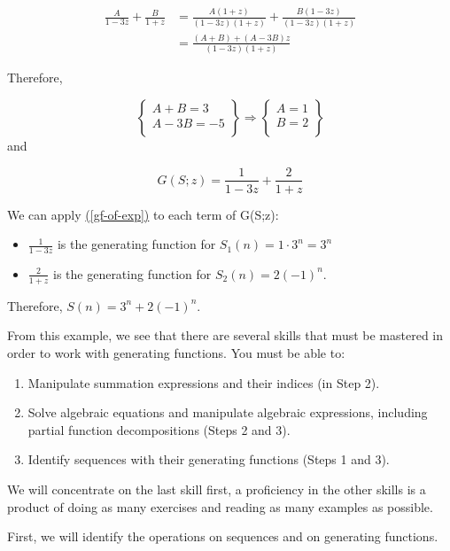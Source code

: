 \documentclass[10pt,]{book}
\theoremstyle{plain}
\theoremstyle{definition}
\theoremstyle{definition}
\theoremstyle{definition}
\theoremstyle{definition}
\numberwithin{equation}{section}
\begin{document}
\begin{enumerate}[label=\arabic*]
\begin{equation*}
\begin{split}
\frac{A}{1-3z}+ \frac{B}{1+z} &=\frac{A(1+z)}{(1-3z)(1+z)}+ \frac{B(1-3z)}{(1-3z)(1+z)}\\
		& =\frac{(A+B)+(A-3B)z}{(1-3z)(1+z)}
\end{split}
\end{equation*}
%
\par
Therefore,



 \[\left\{
\begin{array}{c}
 A+B=3 \\
 A-3B=-5 \\
\end{array}
\right\}\Rightarrow \left\{
\begin{array}{c}
 A=1 \\
 B=2 \\
\end{array}
\right\}\]
and

\[G(S;z)= \frac{1}{1-3z}+ \frac{2}{1+z}\]

%
\par
We can apply \hyperref[gf-of-exp]{(\ref{gf-of-exp})} to each term of G(S;z):%
\par
%
\begin{itemize}[label=\textbullet]
\item{}\(\frac{1}{1-3z}\) is the generating function for \(S_1(n)=1\cdot  3^n= 3^n\)%
\item{}\(\frac{2}{1+z}\) is the generating function for \(S_2(n)=2(-1)^n\).%
\end{itemize}
%
\par
Therefore, \(S(n)=3^n+ 2(-1)^n\).%
\end{enumerate}
%
\par
From this example, we see that there are several skills that must be mastered in order to work with generating functions. You must be able to:%
\par
\leavevmode%
\begin{enumerate}[label=\alph*]
\item\hypertarget{li-128}{}Manipulate summation expressions and their indices (in Step 2).%
\item\hypertarget{li-129}{}Solve algebraic equations and manipulate algebraic expressions, including partial function decompositions (Steps 2 and 3).%
\item\hypertarget{li-130}{} Identify sequences with their generating functions (Steps 1 and 3).%
\end{enumerate}
%
\par
We will concentrate on the last skill first, a proficiency in the other skills is a product of doing as many exercises and reading as many examples as possible.%
\par
First, we will identify the operations on sequences and on generating functions.%
\typeout{************************************************}
\typeout{************************************************}
\end{document}
